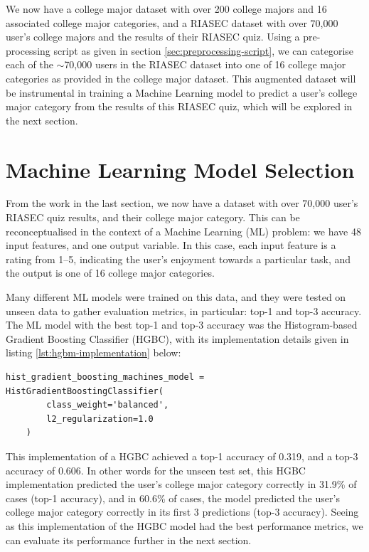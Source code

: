 We now have a college major dataset with over 200 college majors and 16 associated college major categories, 
and a RIASEC dataset with over 70,000 user's college majors and the results of their RIASEC quiz.
Using a pre-processing script as given in section \ref{sec:preprocessing-script},
we can categorise each of the $\sim$70,000 users in the RIASEC dataset into one of 16 college major categories as provided in the college major dataset.
This augmented dataset will be instrumental in training a Machine Learning model to predict a user's college major category from the results
of this RIASEC quiz, which will be explored in the next section.

\section{Machine Learning Model Selection}

From the work in the last section, we now have a dataset with over 70,000 user's RIASEC quiz results, and their college major category.
This can be reconceptualised in the context of a Machine Learning (ML) problem: 
we have 48 input features, and one output variable.
In this case, each input feature is a rating from 1--5, indicating the user's enjoyment towards a particular task,
and the output is one of 16 college major categories.

Many different ML models were trained on this data, and they were tested on unseen data to gather evaluation metrics,
in particular: top-1 and top-3 accuracy.
The ML model with the best
top-1 and top-3 accuracy was the Histogram-based Gradient Boosting Classifier (HGBC), with its implementation details given in listing \ref{lst:hgbm-implementation} below:

\begin{lstlisting}[caption={Histogram Gradient Boosting Classifier Implementation}, label={lst:hgbm-implementation}]
hist_gradient_boosting_machines_model = HistGradientBoostingClassifier(
        class_weight='balanced',
        l2_regularization=1.0
    )
\end{lstlisting}

This implementation of a HGBC achieved a top-1 accuracy of 0.319, and a top-3 accuracy of 0.606.
In other words for the unseen test set, this HGBC implementation predicted the user's college major category correctly in 31.9\% of cases (top-1 accuracy), 
and in 60.6\% of cases, the model predicted the user's college major category correctly in its first 3 predictions (top-3 accuracy).
Seeing as this implementation of the HGBC model had the best performance metrics, we can evaluate its performance further in the next section.

